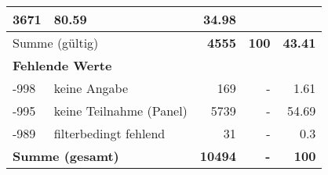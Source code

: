 \begin{longtable}{lXrrr}
       \num{3671} &
       \num[round-mode=places,round-precision=2]{80.59} &
         \num[round-mode=places,round-precision=2]{34.98} \\
     \midrule
     \multicolumn{2}{l}{Summe (gültig)} &
       \textbf{\num{4555}} &
     \textbf{\num{100}} &
       \textbf{\num[round-mode=places,round-precision=2]{43.41}} \\
     \multicolumn{5}{l}{\textbf{Fehlende Werte}}\\
       -998 &
       keine Angabe &
         \num{169} &
        - &
         \num[round-mode=places,round-precision=2]{1.61} \\
       -995 &
       keine Teilnahme (Panel) &
         \num{5739} &
        - &
         \num[round-mode=places,round-precision=2]{54.69} \\
       -989 &
       filterbedingt fehlend &
         \num{31} &
        - &
         \num[round-mode=places,round-precision=2]{0.3} \\
     \midrule
     \multicolumn{2}{l}{\textbf{Summe (gesamt)}} &
          \textbf{\num{10494}} &
        \textbf{-} &
        \textbf{\num{100}} \\
     \bottomrule
     \end{longtable}
     
